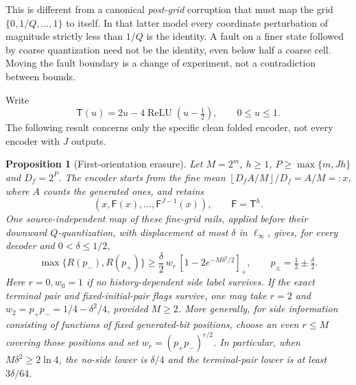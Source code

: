 \documentclass[11pt,letterpaper]{article}
\newtheorem{proposition}[theorem]{Proposition}
\theoremstyle{definition}\newtheorem{definition}[theorem]{Definition}
\theoremstyle{remark}\newtheorem{remark}[theorem]{Remark}
\newcommand{\floor}[1]{\left\lfloor #1\right\rfloor}
\begin{document}
This is different from a canonical \emph{post-grid} corruption that must map the grid $\{0,1/Q,\ldots,1\}$ to itself. In that latter model every coordinate perturbation of magnitude strictly less than $1/Q$ is the identity. A fault on a finer state followed by coarse quantization need not be the identity, even below half a coarse cell. Moving the fault boundary is a change of experiment, not a contradiction between bounds.

Write
\[
 \mathsf T(u)=2u-4\operatorname{ReLU}(u-\tfrac12),\qquad 0\le u\le1.
\]
The following result concerns only the specific clean folded encoder, not every encoder with $J$ outputs.

\begin{proposition}[First-orientation erasure]\label{prop:foldfragility}
Let $M=2^m$, $h\ge1$, $P\ge\max\{m,Jh\}$ and $D_f=2^P$. The encoder starts from the fine mean $\floor{D_f A/M}/D_f=A/M=:x$, where $A$ counts the generated ones, and retains
\[
 (x,\mathsf F(x),\ldots,\mathsf F^{J-1}(x)),\qquad \mathsf F=\mathsf T^h.
\]
One source-independent map of these fine-grid rails, applied before their downward $Q$-quantization, with displacement at most $\delta$ in $\ell_\infty$, gives, for every decoder and $0<\delta\le1/2$,
\begin{equation}\label{eq:foldfragility}
 \max\{R(p_-),R(p_+)\}
 \ge \frac\delta2\,w_r\,[1-2e^{-M\delta^2/2}]_+,
 \qquad p_\pm=\tfrac12\pm\tfrac\delta2.
\end{equation}
Here $r=0,w_0=1$ if no history-dependent side label survives. If the exact terminal pair and fixed-initial-pair flags survive, one may take $r=2$ and $w_2=p_+p_-=1/4-\delta^2/4$, provided $M\ge2$. More generally, for side information consisting of functions of fixed generated-bit positions, choose an even $r\le M$ covering those positions and set $w_r=(p_+p_-)^{r/2}$.
In particular, when $M\delta^2\ge2\ln4$, the no-side lower is $\delta/4$ and the terminal-pair lower is at least $3\delta/64$.
\end{proposition}
\end{document}
